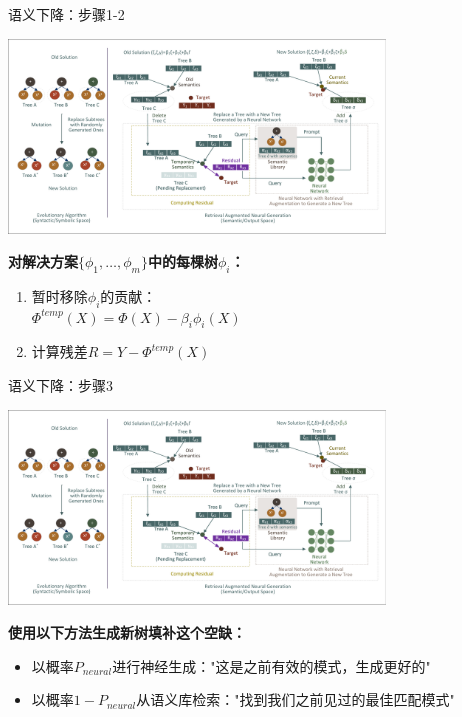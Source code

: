 \documentclass[aspectratio=1610]{beamer}
\begin{document}
    \begin{frame}{语义下降：步骤1-2}
        \begin{center}
            \includegraphics[width=0.75\textwidth, trim=8pt 8pt 8pt 8pt, clip]{figs/Motivation.pdf}
        \end{center}

        \textbf{对解决方案$\{\phi_1, \ldots, \phi_m\}$中的每棵树$\phi_i$：}
        \begin{enumerate}
            \item 暂时移除$\phi_i$的贡献：\\
            $\Phi^{temp}(X) = \Phi(X) - \beta_i \phi_i(X)$
            \item 计算残差$R = Y - \Phi^{temp}(X)$
        \end{enumerate}
    \end{frame}
    \begin{frame}{语义下降：步骤3}
        \begin{center}
            \includegraphics[width=0.75\textwidth, trim=8pt 8pt 8pt 8pt, clip]{figs/Motivation.pdf}
        \end{center}

        \textbf{使用以下方法生成新树填补这个空缺：}
        \begin{itemize}
            \item 以概率$P_{neural}$进行神经生成："这是之前有效的模式，生成更好的"
            \item 以概率$1-P_{neural}$从语义库检索："找到我们之前见过的最佳匹配模式"
        \end{itemize}
    \end{frame}
\end{document}
